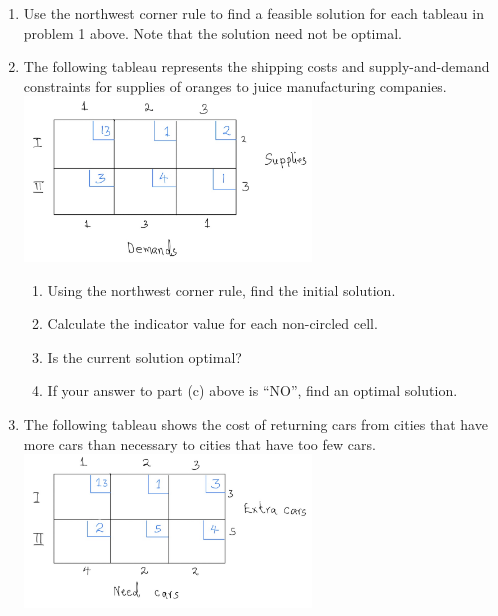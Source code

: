 \documentclass[
  letterpaper,
  DIV=11,
  numbers=noendperiod]{scrreprt}
\providecommand{\tightlist}{%
  \setlength{\itemsep}{0pt}\setlength{\parskip}{0pt}}\usepackage{longtable,booktabs,array}
\begin{document}
\begin{enumerate}
\def\labelenumi{\arabic{enumi}.}
\setcounter{enumi}{1}
\item
  Use the northwest corner rule to find a feasible solution for each
  tableau in problem 1 above. Note that the solution need not be
  optimal.
\item
  The following tableau represents the shipping costs and
  supply-and-demand constraints for supplies of oranges to juice
  manufacturing
  companies.\includegraphics[width=0.6\textwidth,height=\textheight]{images/t3.jpeg}

  \begin{enumerate}
  \def\labelenumii{\alph{enumii})}
  \tightlist
  \item
    Using the northwest corner rule, find the initial solution.
  \item
    Calculate the indicator value for each non-circled cell.
  \item
    Is the current solution optimal?
  \item
    If your answer to part (c) above is ``NO'', find an optimal
    solution.
  \end{enumerate}
\item
  The following tableau shows the cost of returning cars from cities
  that have more cars than necessary to cities that have too few
  cars.\includegraphics[width=0.6\textwidth,height=\textheight]{images/t4.jpeg}


\end{enumerate}
\end{document}
